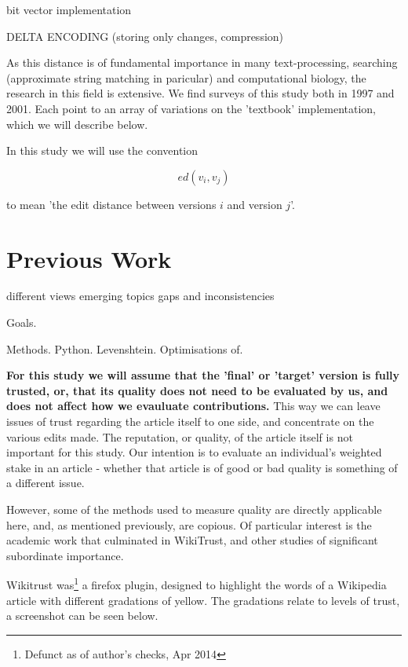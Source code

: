 \documentclass[a4paper,11pt,twoside,notitlepage]{article}
\begin{document}
        bit vector implementation\cite{Hyyro2003}

        DELTA ENCODING (storing only changes, compression)

        As this distance is of
        fundamental importance in many text-processing, searching
        (approximate string matching in paricular) and computational
        biology, the research in this field is extensive. We find
        surveys of this study both in 1997\cite{Gusfield1997} and
        2001\cite{Navarro2001}. Each point to an array of variations
        on the 'textbook' implementation, which we will describe
        below.
        
         In this study we will use
        the convention 

        $$ed(v_i,v_j)$$ 

        to mean 'the edit distance between
        versions $i$ and version $j$'. 


        \section{Previous Work}
        different views emerging topics gaps and inconsistencies

        Goals.

        Methods. Python. Levenshtein. Optimisations of.
     
        \textbf{For this study we will assume that the 'final' or
          'target' version is fully trusted, or, that its quality does
          not need to be evaluated by us, and does not affect how we
          evauluate contributions.} This way we can leave issues of
        trust regarding the article itself to one side, and
        concentrate on the various edits made. The reputation, or
        quality, of the article itself is not important for this
        study. Our intention is to evaluate an individual's weighted
        stake in an article - whether that article is of good or bad
        quality is something of a different issue.

        However, some of the methods used to measure quality are
        directly applicable here, and, as mentioned previously, are
        copious. Of particular interest is the academic work that
        culminated in WikiTrust,\cite{Adler2006}\cite{Adler2007} and
        other studies of significant subordinate
        importance.\cite{Zeng2006}\cite{Cross2006}

        Wikitrust was\footnote{Defunct as of author's checks, Apr
          2014} a firefox plugin, designed to highlight the
        words of a Wikipedia article with different gradations of
        yellow. The gradations relate to levels of trust, a screenshot
        can be seen below.
        
\end{document}
